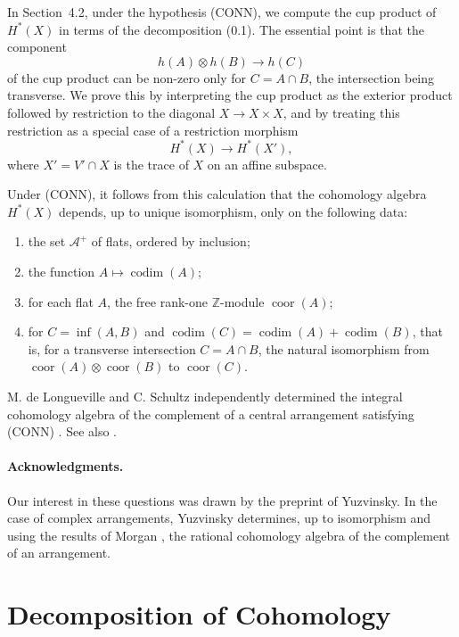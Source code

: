 \documentclass[11pt]{article}
\theoremstyle{definition}
\newcommand{\ZZ}{\mathbb Z}
\newcommand{\codim}{\operatorname{codim}}
\newcommand{\coor}{\operatorname{coor}}
\begin{document}
In Section~4.2, under the hypothesis \textup{(CONN)}, we compute the cup product of $H^*(X)$ in terms of the decomposition (0.1).  The essential point is that the component
\[
 h(A)\otimes h(B)\longrightarrow h(C)
\]
of the cup product can be non-zero only for $C=A\cap B$, the intersection being transverse.  We prove this by interpreting the cup product as the exterior product followed by restriction to the diagonal $X\to X\times X$, and by treating this restriction as a special case of a restriction morphism
\[
H^*(X)\longrightarrow H^*(X'),
\]
where $X'=V'\cap X$ is the trace of $X$ on an affine subspace.

Under \textup{(CONN)}, it follows from this calculation that the cohomology algebra $H^*(X)$ depends, up to unique isomorphism, only on the following data:
\begin{enumerate}[label=(\alph*)]
\item the set $\mathcal A^+$ of flats, ordered by inclusion;
\item the function $A\mapsto \codim(A)$;
\item for each flat $A$, the free rank-one $\ZZ$-module $\coor(A)$;
\item for $C=\inf(A,B)$ and $\codim(C)=\codim(A)+\codim(B)$, that is, for a transverse intersection $C=A\cap B$, the natural isomorphism from $\coor(A)\otimes\coor(B)$ to $\coor(C)$.
\end{enumerate}

M. de Longueville and C. Schultz independently determined the integral cohomology algebra of the complement of a central arrangement satisfying \textup{(CONN)} \cite{dS}.  See also \cite{FZ}.

\paragraph{Acknowledgments.} Our interest in these questions was drawn by the preprint \cite{Y} of Yuzvinsky.  In the case of complex arrangements, Yuzvinsky determines, up to isomorphism and using the results of Morgan \cite{M}, the rational cohomology algebra of the complement of an arrangement.

\section{Decomposition of Cohomology}
\end{document}
